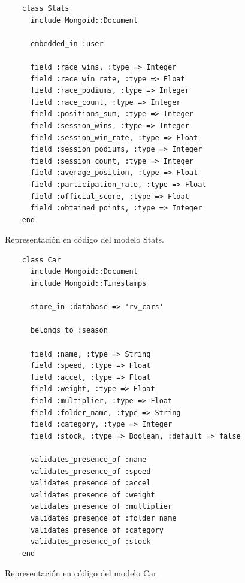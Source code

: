 \begin{listing}
  \begin{verbatim}
    class Stats
      include Mongoid::Document
      
      embedded_in :user
      
      field :race_wins, :type => Integer
      field :race_win_rate, :type => Float
      field :race_podiums, :type => Integer
      field :race_count, :type => Integer
      field :positions_sum, :type => Integer
      field :session_wins, :type => Integer
      field :session_win_rate, :type => Float
      field :session_podiums, :type => Integer
      field :session_count, :type => Integer
      field :average_position, :type => Float
      field :participation_rate, :type => Float
      field :official_score, :type => Float
      field :obtained_points, :type => Integer
    end
  \end{verbatim}
  \caption[Esquema de Stats]{Representación en código del modelo Stats.}
\end{listing}

\begin{listing}
  \begin{verbatim}
    class Car
      include Mongoid::Document
      include Mongoid::Timestamps
      
      store_in :database => 'rv_cars'
      
      belongs_to :season
      
      field :name, :type => String
      field :speed, :type => Float
      field :accel, :type => Float
      field :weight, :type => Float
      field :multiplier, :type => Float
      field :folder_name, :type => String
      field :category, :type => Integer
      field :stock, :type => Boolean, :default => false
      
      validates_presence_of :name
      validates_presence_of :speed
      validates_presence_of :accel
      validates_presence_of :weight
      validates_presence_of :multiplier
      validates_presence_of :folder_name
      validates_presence_of :category
      validates_presence_of :stock
    end
  \end{verbatim}
  \caption[Esquema de Car]{Representación en código del modelo Car.}
\end{listing}

